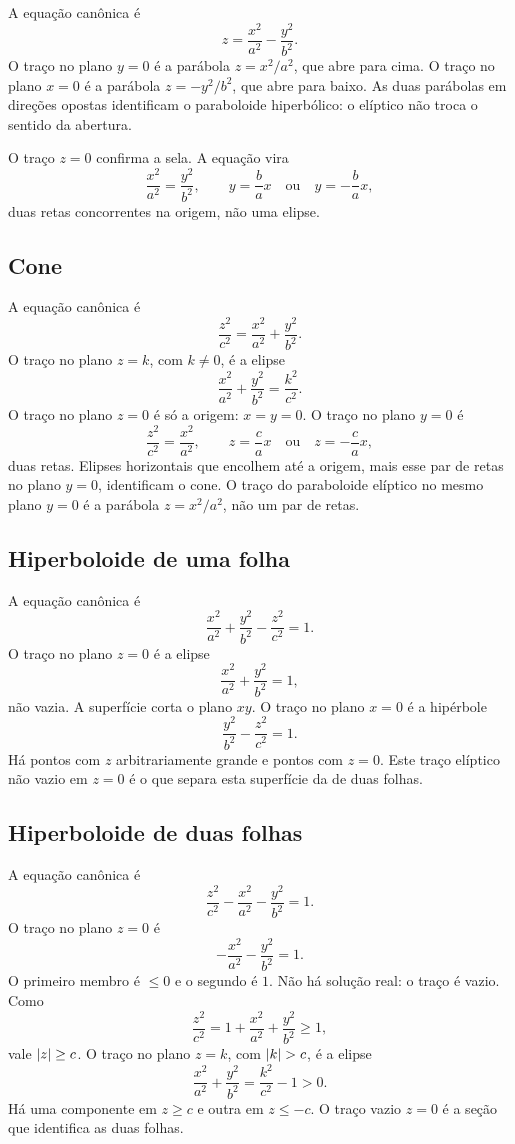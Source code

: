 \documentclass[11pt,a4paper]{article}
\begin{document}
A equação canônica é
\[
z=\frac{x^{2}}{a^{2}}-\frac{y^{2}}{b^{2}}.
\]
O traço no plano \(y=0\) é a parábola \(z=x^{2}/a^{2}\), que abre para cima. O traço no plano \(x=0\) é a parábola \(z=-y^{2}/b^{2}\), que abre para baixo. As duas parábolas em direções opostas identificam o paraboloide hiperbólico: o elíptico não troca o sentido da abertura.

O traço \(z=0\) confirma a sela. A equação vira
\[
\frac{x^{2}}{a^{2}}=\frac{y^{2}}{b^{2}},
\qquad
y=\frac{b}{a}x
\quad\text{ou}\quad
y=-\frac{b}{a}x,
\]
duas retas concorrentes na origem, não uma elipse.

\subsection{Cone}

A equação canônica é
\[
\frac{z^{2}}{c^{2}}=\frac{x^{2}}{a^{2}}+\frac{y^{2}}{b^{2}}.
\]
O traço no plano \(z=k\), com \(k\neq 0\), é a elipse
\[
\frac{x^{2}}{a^{2}}+\frac{y^{2}}{b^{2}}=\frac{k^{2}}{c^{2}}.
\]
O traço no plano \(z=0\) é só a origem: \(x=y=0\). O traço no plano \(y=0\) é
\[
\frac{z^{2}}{c^{2}}=\frac{x^{2}}{a^{2}},
\qquad
z=\frac{c}{a}x
\quad\text{ou}\quad
z=-\frac{c}{a}x,
\]
duas retas. Elipses horizontais que encolhem até a origem, mais esse par de retas no plano \(y=0\), identificam o cone. O traço do paraboloide elíptico no mesmo plano \(y=0\) é a parábola \(z=x^{2}/a^{2}\), não um par de retas.

\subsection{Hiperboloide de uma folha}

A equação canônica é
\[
\frac{x^{2}}{a^{2}}+\frac{y^{2}}{b^{2}}-\frac{z^{2}}{c^{2}}=1.
\]
O traço no plano \(z=0\) é a elipse
\[
\frac{x^{2}}{a^{2}}+\frac{y^{2}}{b^{2}}=1,
\]
não vazia. A superfície corta o plano \(xy\). O traço no plano \(x=0\) é a hipérbole
\[
\frac{y^{2}}{b^{2}}-\frac{z^{2}}{c^{2}}=1.
\]
Há pontos com \(z\) arbitrariamente grande e pontos com \(z=0\). Este traço elíptico não vazio em \(z=0\) é o que separa esta superfície da de duas folhas.

\subsection{Hiperboloide de duas folhas}

A equação canônica é
\[
\frac{z^{2}}{c^{2}}-\frac{x^{2}}{a^{2}}-\frac{y^{2}}{b^{2}}=1.
\]
O traço no plano \(z=0\) é
\[
-\frac{x^{2}}{a^{2}}-\frac{y^{2}}{b^{2}}=1.
\]
O primeiro membro é \(\le 0\) e o segundo é \(1\). Não há solução real: o traço é vazio. Como
\[
\frac{z^{2}}{c^{2}}=1+\frac{x^{2}}{a^{2}}+\frac{y^{2}}{b^{2}}\ge 1,
\]
vale \(\left\lvert z \right\rvert\ge c\). O traço no plano \(z=k\), com \(\left\lvert k \right\rvert>c\), é a elipse
\[
\frac{x^{2}}{a^{2}}+\frac{y^{2}}{b^{2}}=\frac{k^{2}}{c^{2}}-1>0.
\]
Há uma componente em \(z\ge c\) e outra em \(z\le -c\). O traço vazio \(z=0\) é a seção que identifica as duas folhas.
\end{document}
